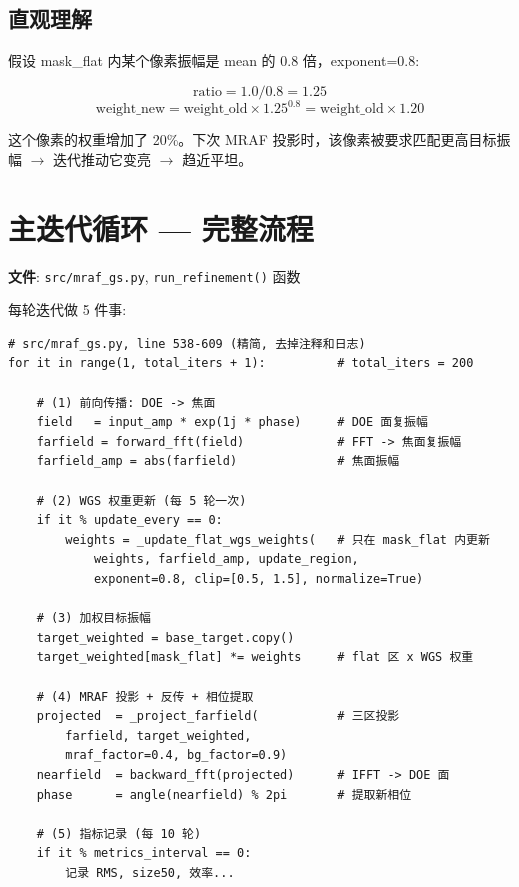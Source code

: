 \documentclass[11pt,a4paper]{ctexart}
\begin{document}
\subsection{直观理解}

假设 mask\_flat 内某个像素振幅是 mean 的 0.8 倍，exponent=0.8:

\[
\text{ratio} = 1.0 / 0.8 = 1.25
\]
\[
\text{weight\_new} = \text{weight\_old} \times 1.25^{0.8} = \text{weight\_old} \times 1.20
\]

这个像素的权重增加了 20\%。下次 MRAF 投影时，该像素被要求匹配更高目标振幅 $\rightarrow$ 迭代推动它变亮 $\rightarrow$ 趋近平坦。

\section{主迭代循环 — 完整流程}

\textbf{文件}: \texttt{src/mraf\_gs.py}, \texttt{run\_refinement()} 函数

每轮迭代做 5 件事:

\begin{lstlisting}
# src/mraf_gs.py, line 538-609 (精简, 去掉注释和日志)
for it in range(1, total_iters + 1):          # total_iters = 200

    # (1) 前向传播: DOE -> 焦面
    field   = input_amp * exp(1j * phase)     # DOE 面复振幅
    farfield = forward_fft(field)             # FFT -> 焦面复振幅
    farfield_amp = abs(farfield)              # 焦面振幅

    # (2) WGS 权重更新 (每 5 轮一次)
    if it % update_every == 0:
        weights = _update_flat_wgs_weights(   # 只在 mask_flat 内更新
            weights, farfield_amp, update_region,
            exponent=0.8, clip=[0.5, 1.5], normalize=True)

    # (3) 加权目标振幅
    target_weighted = base_target.copy()
    target_weighted[mask_flat] *= weights     # flat 区 x WGS 权重

    # (4) MRAF 投影 + 反传 + 相位提取
    projected  = _project_farfield(           # 三区投影
        farfield, target_weighted,
        mraf_factor=0.4, bg_factor=0.9)
    nearfield  = backward_fft(projected)      # IFFT -> DOE 面
    phase      = angle(nearfield) % 2pi       # 提取新相位

    # (5) 指标记录 (每 10 轮)
    if it % metrics_interval == 0:
        记录 RMS, size50, 效率...
\end{lstlisting}
\end{document}
